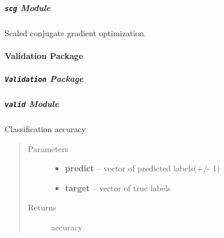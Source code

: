 \documentclass[letterpaper,10pt,english]{sphinxmanual}
\begin{document}
\subparagraph{\texttt{scg} Module}
\label{pyGPs.Optimization:scg-module}\label{pyGPs.Optimization:module-pyGPs.Optimization.scg}

\begin{fulllineitems}
\label{pyGPs.Optimization:pyGPs.Optimization.scg.run}
Scaled conjugate gradient optimization.

\end{fulllineitems}



\paragraph{Validation Package}
\label{pyGPs.Validation:validation-package}\label{pyGPs.Validation::doc}

\subparagraph{\texttt{Validation} Package}
\label{pyGPs.Validation:id1}\label{pyGPs.Validation:module-pyGPs.Validation}

\subparagraph{\texttt{valid} Module}
\label{pyGPs.Validation:valid-module}\label{pyGPs.Validation:module-pyGPs.Validation.valid}

\begin{fulllineitems}
\label{pyGPs.Validation:pyGPs.Validation.valid.ACC}
Classification accuracy
\begin{quote}\begin{description}
\item[{Parameters}] \leavevmode\begin{itemize}
\item {} 
\textbf{predict} -- vector of predicted labels(+/- 1)

\item {} 
\textbf{target} -- vector of true labels

\end{itemize}

\item[{Returns}] \leavevmode
accuracy

\end{description}\end{quote}

\end{fulllineitems}
\end{document}
